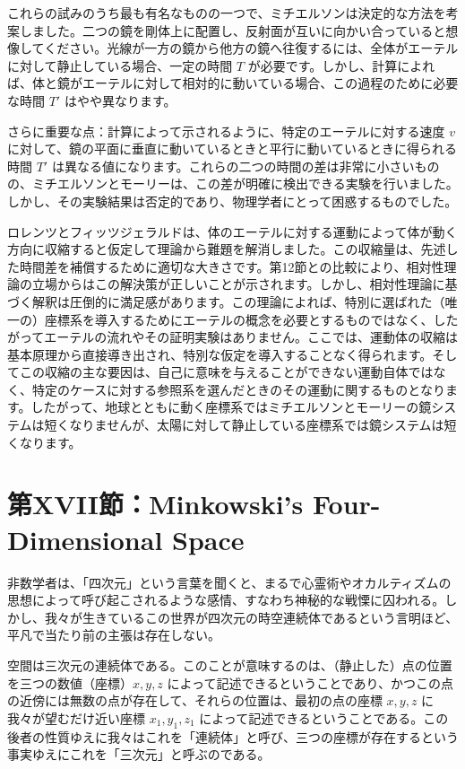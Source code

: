 \documentclass[a4paper,11pt,openany]{ltjsbook}
\begin{document}
これらの試みのうち最も有名なものの一つで、ミチエルソンは決定的な方法を考案しました。二つの鏡を剛体上に配置し、反射面が互いに向かい合っていると想像してください。光線が一方の鏡から他方の鏡へ往復するには、全体がエーテルに対して静止している場合、一定の時間 $T$ が必要です。しかし、計算によれば、体と鏡がエーテルに対して相対的に動いている場合、この過程のために必要な時間 $T′$ はやや異なります。

さらに重要な点：計算によって示されるように、特定のエーテルに対する速度 $v$ に対して、鏡の平面に垂直に動いているときと平行に動いているときに得られる時間 $T′$ は異なる値になります。これらの二つの時間の差は非常に小さいものの、ミチエルソンとモーリーは、この差が明確に検出できる実験を行いました。しかし、その実験結果は否定的であり、物理学者にとって困惑するものでした。

ロレンツとフィッツジェラルドは、体のエーテルに対する運動によって体が動く方向に収縮すると仮定して理論から難題を解消しました。この収縮量は、先述した時間差を補償するために適切な大きさです。第12節との比較により、相対性理論の立場からはこの解決策が正しいことが示されます。しかし、相対性理論に基づく解釈は圧倒的に満足感があります。この理論によれば、特別に選ばれた（唯一の）座標系を導入するためにエーテルの概念を必要とするものではなく、したがってエーテルの流れやその証明実験はありません。ここでは、運動体の収縮は基本原理から直接導き出され、特別な仮定を導入することなく得られます。そしてこの収縮の主な要因は、自己に意味を与えることができない運動自体ではなく、特定のケースに対する参照系を選んだときのその運動に関するものとなります。したがって、地球とともに動く座標系ではミチエルソンとモーリーの鏡システムは短くなりませんが、太陽に対して静止している座標系では鏡システムは短くなります。


\clearpage
\chapter{第XVII節：Minkowski's Four-Dimensional Space}

非数学者は、「四次元」という言葉を聞くと、まるで心霊術やオカルティズムの思想によって呼び起こされるような感情、すなわち神秘的な戦慄に囚われる。しかし、我々が生きているこの世界が四次元の時空連続体であるという言明ほど、平凡で当たり前の主張は存在しない。

空間は三次元の連続体である。このことが意味するのは、（静止した）点の位置を三つの数値（座標）$x, y, z$ によって記述できるということであり、かつこの点の近傍には無数の点が存在して、それらの位置は、最初の点の座標 $x, y, z$ に我々が望むだけ近い座標 $x_1, y_1, z_1$ によって記述できるということである。この後者の性質ゆえに我々はこれを「連続体」と呼び、三つの座標が存在するという事実ゆえにこれを「三次元」と呼ぶのである。
\end{document}
